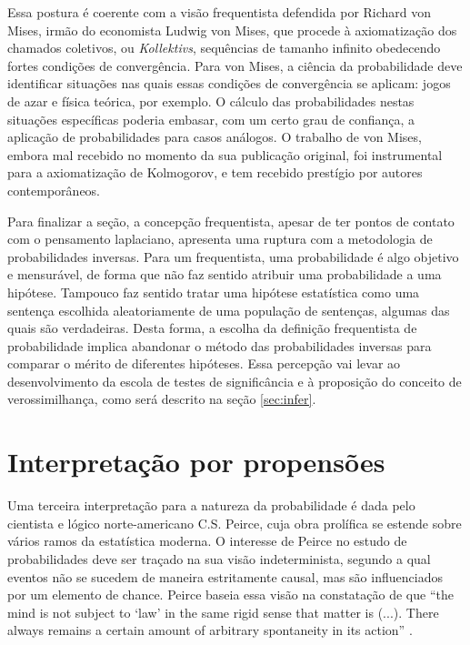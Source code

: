 Essa postura é coerente com a visão frequentista defendida por Richard von Mises, 
irmão do economista Ludwig von Mises, que procede à axiomatização dos chamados coletivos, 
ou {\em Kollektivs}, sequências de tamanho infinito
obedecendo fortes condições de convergência\citep{vonMises1941}. 
Para von Mises, a ciência da probabilidade deve identificar situações nas quais essas condições de 
convergência se aplicam: jogos de azar e física teórica, por exemplo. O cálculo das probabilidades nestas
situações específicas poderia embasar, com um certo grau de confiança, a aplicação de probabilidades para
casos análogos. O trabalho de von Mises, embora mal recebido no momento da sua publicação original, foi 
instrumental para a axiomatização de Kolmogorov\citep{Shafer03}, e tem recebido prestígio por autores 
contemporâneos.

Para finalizar a seção, 
a concepção frequentista, apesar de ter pontos de contato com o pensamento laplaciano, apresenta
uma ruptura com a metodologia de probabilidades inversas. Para um frequentista, uma probabilidade é algo objetivo
e mensurável, de forma que não faz sentido atribuir uma probabilidade a uma hipótese. 
Tampouco faz sentido tratar uma hipótese estatística como uma sentença escolhida aleatoriamente 
de uma população de sentenças, algumas das quais são verdadeiras.
Desta forma, a escolha da definição frequentista de probabilidade implica abandonar o método
das probabilidades inversas para comparar o mérito de diferentes hipóteses.
Essa percepção vai levar ao desenvolvimento da escola de testes de significância e à 
proposição do conceito de verossimilhança, como será descrito na seção \ref{sec:infer}.

\section{Interpretação por propensões}

Uma terceira interpretação para a natureza da probabilidade é dada pelo cientista e lógico norte-americano 
C.S. Peirce,
cuja obra prolífica se estende sobre vários ramos da estatística moderna. 
O interesse de Peirce no estudo de probabilidades
deve ser traçado na sua visão indeterminista, segundo a qual eventos não 
se sucedem de maneira estritamente causal, mas são
influenciados por um elemento de chance. Peirce baseia essa visão 
na constatação de que ``the mind is not subject to `law'
in the same rigid sense that matter is (...). There always remains 
a certain amount of arbitrary spontaneity in its action''
\citep{Peirce1892}. 

